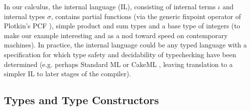 \documentclass[9pt,preprint]{sigplanconf}
\begin{document}
In our calculus, the internal language (IL), consisting of internal terms $\iota$ and internal types $\sigma$, contains partial functions (via the generic fixpoint operator of Plotkin's PCF \cite{PCF}), simple product and sum types and a base type of integers (to make our example interesting and as a nod toward speed on contemporary machines). In practice, the internal language could be any typed  language with a specification for which type safety and decidability of typechecking have been determined (e.g. perhaps Standard ML or CakeML \cite{cakeml}, leaving translation to a simpler IL to later stages of the compiler).

\subsection{Types and Type Constructors}
\end{document}
